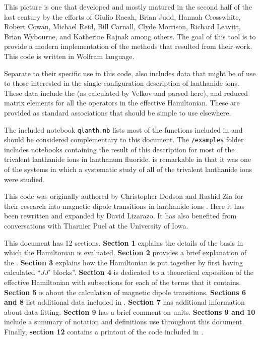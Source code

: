 \documentclass{article}
\newcommand{\codetext}[1]{{\color{BlueViolet} \texttt{#1}}}
\begin{document}
This picture is one that developed and mostly matured in the second half of the last century by the efforts of Giulio Racah, Brian Judd, Hannah Crosswhite, Robert Cowan, Michael Reid, Bill Carnall, Clyde Morrison, Richard Leavitt, Brian Wybourne, and Katherine Rajnak among others. The goal of this tool is to provide a modern implementation of the methods that resulted from their work. This code is written in Wolfram language.

Separate to their specific use in this code, \qlanth also includes data that might be of use to those interested in the single-configuration description of lanthanide ions. These data include the \cfps (as calculated by Velkov and parsed here), and reduced matrix elements for all the operators in the effective Hamiltonian. These are provided as standard \mathematica associations that should be simple to use elsewhere.

The included \mathematica notebook \codetext{qlanth.nb} lists most of the functions included in \qlanth and should be considered complementary to this document. The \codetext{/examples} folder includes notebooks containing the result of this description for most of the trivalent lanthanide ions in lanthanum fluoride. \LaFthree is remarkable in that it was one of the systems in which a systematic study \cite{carnall_systematic_1989} of all of the trivalent lanthanide ions were studied.

This code was originally authored by Christopher Dodson and Rashid Zia for their research into magnetic dipole transitions in lanthanide ions \cite{dodson_magnetic_2012}. Here it has been rewritten and expanded by David Lizarazo. It has also benefited from conversations with Tharnier Puel at the University of Iowa.

This document has 12 sections. \textbf{Section 1} explains the details of the basis in which the Hamiltonian is evaluated. \textbf{Section 2} provides a brief explanation of the \cfps. \textbf{Section 3} explains how the Hamiltonian is put together by first having calculated ``$JJ'$ blocks''. \textbf{Section 4} is dedicated to a theoretical exposition of the effective Hamiltonian with subsections for each of the terms that it contains. \textbf{Section 5} is about the calculation of magnetic dipole transitions. \textbf{Sections 6 and 8} list additional data included in \qlanth. \textbf{Section 7} has additional information about data fitting.  \textbf{Section 9} has a brief comment on units. \textbf{Sections 9 and 10} include a summary of notation and definitions use throughout this document. Finally, \textbf{section 12} contains a printout of the code included in \qlanth.
\end{document}
